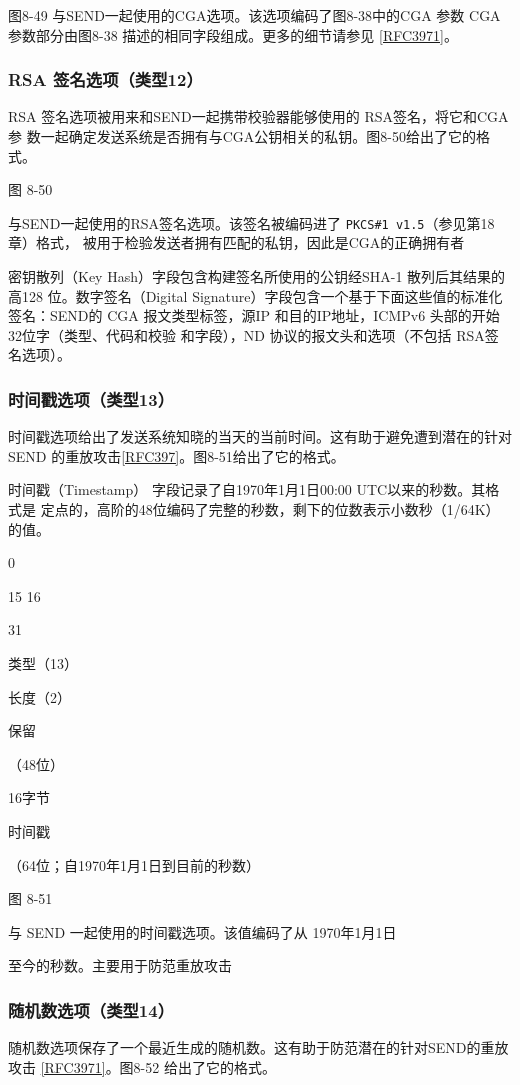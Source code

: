 图8-49 与SEND一起使用的CGA选项。该选项编码了图8-38中的CGA 参数
CGA 参数部分由图8-38 描述的相同字段组成。更多的细节请参见 \href{https://www.rfc-editor.org/rfc/rfc3971}{[RFC3971]}。

\subsubsection{RSA 签名选项（类型12）}
RSA 签名选项被用来和SEND一起携带校验器能够使用的 RSA签名，将它和CGA参
数一起确定发送系统是否拥有与CGA公钥相关的私钥。图8-50给出了它的格式。


图 8-50

与SEND一起使用的RSA签名选项。该签名被编码进了 \verb|PKCS#1 v1.5|（参见第18章）格式，
被用于检验发送者拥有匹配的私钥，因此是CGA的正确拥有者

密钥散列（Key Hash）字段包含构建签名所使用的公钥经SHA-1 散列后其结果的高128
位。数字签名（Digital Signature）字段包含一个基于下面这些值的标准化签名：SEND的
CGA 报文类型标签，源IP 和目的IP地址，ICMPv6 头部的开始32位字（类型、代码和校验
和字段），ND 协议的报文头和选项（不包括 RSA签名选项）。

\subsubsection{时间戳选项（类型13）}
时间戳选项给出了发送系统知晓的当天的当前时间。这有助于避免遭到潜在的针对
SEND 的重放攻击\href{https://www.rfc-editor.org/rfc/rfc397}{[RFC397]}。图8-51给出了它的格式。

时间戳（Timestamp） 字段记录了自1970年1月1日00:00 UTC以来的秒数。其格式是
定点的，高阶的48位编码了完整的秒数，剩下的位数表示小数秒（1/64K）的值。

0

15 16

31

类型（13）

长度（2）

保留

（48位）

16字节

时间戳

（64位；自1970年1月1日到目前的秒数）

图 8-51

与 SEND 一起使用的时间戳选项。该值编码了从 1970年1月1日

至今的秒数。主要用于防范重放攻击

\subsubsection{随机数选项（类型14）}
随机数选项保存了一个最近生成的随机数。这有助于防范潜在的针对SEND的重放攻击
\href{https://www.rfc-editor.org/rfc/rfc3971}{[RFC3971]}。图8-52 给出了它的格式。

